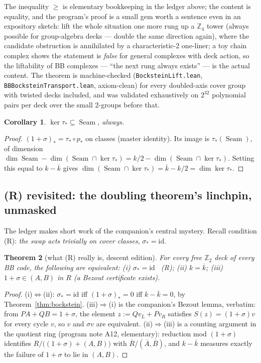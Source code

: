 \documentclass[11pt]{article}
\theoremstyle{plain}
\newtheorem{theorem}{Theorem}[section]
\newtheorem{corollary}[theorem]{Corollary}
\theoremstyle{definition}
\theoremstyle{remark}
\newcommand{\Z}{\mathbb{Z}}
\newcommand{\Seam}{\operatorname{Seam}}
\newcommand{\Rbase}{\overline{R}}
\newcommand{\Rcov}{R}
\newcommand{\ov}[1]{\overline{#1}}
\begin{document}
The inequality $\geq$ is elementary bookkeeping in the ledger above; the
content is equality, and the program's proof is a small gem worth a
sentence even in an expository sketch: lift the whole situation one more
rung up a $\Z_4$ tower (always possible for group-algebra decks ---
double the same direction again), where the candidate obstruction is
annihilated by a characteristic-2 one-liner; a toy chain complex shows
the statement is \emph{false} for general complexes with deck action, so
the liftability of BB complexes --- ``the next rung always exists'' ---
is the actual content. The theorem is machine-checked
(\texttt{BocksteinLift.lean}, \texttt{BBBocksteinTransport.lean},
axiom-clean) for every doubled-axis cover group with twisted decks
included, and was validated exhaustively on $2^{32}$ polynomial pairs per
deck over the small 2-groups before that.

\begin{corollary}\label{cor:kerinseam}
$\ker \tau_* \subseteq \Seam$, always.
\end{corollary}

\begin{proof}
$(1+\sigma)_* = \tau_* \circ p_*$ on classes (master identity). Its image
is $\tau_*(\Seam)$, of dimension $\dim \Seam - \dim(\Seam \cap \ker
\tau_*) = k/2 - \dim(\Seam \cap \ker\tau_*)$. Setting this equal to $k -
\ov k$ gives $\dim(\Seam \cap \ker \tau_*) = \ov k - k/2 = \dim
\ker\tau_*$.
\end{proof}

\subsection{(R) revisited: the doubling theorem's linchpin, unmasked}
\label{sec:Rrevisited}

The ledger makes short work of the companion's central mystery. Recall
condition (R): \emph{the swap acts trivially on cover classes},
$\sigma_* = \mathrm{id}$.

\begin{theorem}[what (R) really is, descent edition]\label{thm:A12}
For every free $\Z_2$ deck of every BB code, the following are
equivalent:
\emph{(i)} $\sigma_* = \mathrm{id}$ \ (R);\quad
\emph{(ii)} $k = \ov k$;\quad
\emph{(iii)} $1 + \sigma \in (A, B)$ in $\Rcov$ (a Bezout certificate
exists).
\end{theorem}

\begin{proof}
(i)$\iff$(ii): $\sigma_* = \mathrm{id}$ iff $(1+\sigma)_* = 0$ iff $k -
\ov k = 0$, by Theorem~\ref{thm:bockstein}. (iii)$\Rightarrow$(i) is the
companion's Bezout lemma, verbatim: from $PA + QB = 1 + \sigma$, the
element $z := Q v_L + P v_R$ satisfies $S(z) = (1+\sigma)v$ for every
cycle $v$, so $v$ and $\sigma v$ are equivalent.
(ii)$\Rightarrow$(iii) is a counting argument in the quotient ring
(program note A12, elementary): reduction mod $(1+\sigma)$ identifies
$\Rcov/\bigl((1{+}\sigma) + (A,B)\bigr)$ with $\Rbase/(\ov A, \ov B)$,
and $k - \ov k$ measures exactly the failure of $1 + \sigma$ to lie in
$(A,B)$.
\end{proof}
\end{document}
